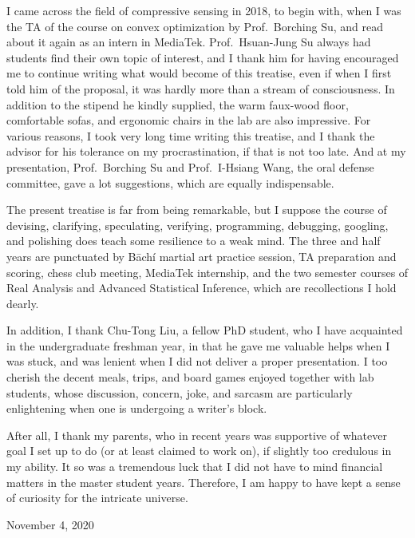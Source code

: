 \starttitle [title={Foreword}]

I came across the field of compressive sensing in 2018, to begin with, when I was the TA of the course on convex optimization by Prof.\ Borching Su, and read about it again as an intern in MediaTek.
Prof.\ Hsuan-Jung Su always had students find their own topic of interest, and I thank him for having encouraged me to continue writing what would become of this treatise, even if when I first told him of the proposal, it was hardly more than a stream of consciousness.
In addition to the stipend he kindly supplied, the warm faux-wood floor, comfortable sofas, and ergonomic chairs in the lab are also impressive.
For various reasons, I took very long time writing this treatise, and I thank the advisor for his tolerance on my procrastination, if that is not too late.
And at my presentation, Prof.\ Borching Su and Prof.\ I-Hsiang Wang, the oral defense committee, gave a lot suggestions, which are equally indispensable.

The present treatise is far from being remarkable, but I suppose the course of devising, clarifying, speculating, verifying, programming, debugging, googling, and polishing does teach some resilience to a weak mind.
The three and half years are punctuated by Bāchí martial art practice session, TA preparation and scoring, chess club meeting, MediaTek internship, and the two semester courses of Real Analysis and Advanced Statistical Inference, which are recollections I hold dearly.

In addition, I thank Chu-Tong Liu, a fellow PhD student, who I have acquainted in the undergraduate freshman year, in that he gave me valuable helps when I was stuck, and was lenient when I did not deliver a proper presentation.
I too cherish the decent meals, trips, and board games enjoyed together with lab students, whose discussion, concern, joke, and sarcasm are particularly enlightening when one is undergoing a writer's block.

After all, I thank my parents, who in recent years was supportive of whatever goal I set up to do (or at least claimed to work on), if slightly too credulous in my ability.
It so was a tremendous luck that I did not have to mind financial matters in the master student years.
Therefore, I am happy to have kept a sense of curiosity for the intricate universe.

November 4, 2020

\stoptitle

